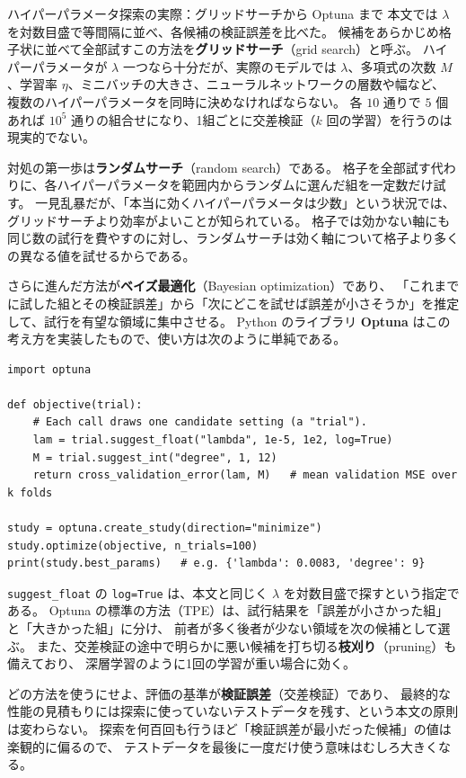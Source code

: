 \begin{mlcolumn}{ハイパーパラメータ探索の実際：グリッドサーチから Optuna まで}
本文では $\lambda$ を対数目盛で等間隔に並べ、各候補の検証誤差を比べた。
候補をあらかじめ格子状に並べて全部試すこの方法を\textbf{グリッドサーチ}（grid search）と呼ぶ。
ハイパーパラメータが $\lambda$ 一つなら十分だが、実際のモデルでは
$\lambda$、多項式の次数 $M$、学習率 $\eta$、ミニバッチの大きさ、ニューラルネットワークの層数や幅など、
複数のハイパーパラメータを同時に決めなければならない。
各 $10$ 通りで $5$ 個あれば $10^5$ 通りの組合せになり、1組ごとに交差検証（$k$ 回の学習）を行うのは現実的でない。

対処の第一歩は\textbf{ランダムサーチ}（random search）である。
格子を全部試す代わりに、各ハイパーパラメータを範囲内からランダムに選んだ組を一定数だけ試す。
一見乱暴だが、「本当に効くハイパーパラメータは少数」という状況では、グリッドサーチより効率がよいことが知られている。
格子では効かない軸にも同じ数の試行を費やすのに対し、ランダムサーチは効く軸について格子より多くの異なる値を試せるからである。

さらに進んだ方法が\textbf{ベイズ最適化}（Bayesian optimization）であり、
「これまでに試した組とその検証誤差」から「次にどこを試せば誤差が小さそうか」を推定して、試行を有望な領域に集中させる。
Python のライブラリ \textbf{Optuna} はこの考え方を実装したもので、使い方は次のように単純である。
\begin{verbatim}
import optuna

def objective(trial):
    # Each call draws one candidate setting (a "trial").
    lam = trial.suggest_float("lambda", 1e-5, 1e2, log=True)
    M = trial.suggest_int("degree", 1, 12)
    return cross_validation_error(lam, M)   # mean validation MSE over k folds

study = optuna.create_study(direction="minimize")
study.optimize(objective, n_trials=100)
print(study.best_params)   # e.g. {'lambda': 0.0083, 'degree': 9}
\end{verbatim}
\texttt{suggest\_float} の \texttt{log=True} は、本文と同じく $\lambda$ を対数目盛で探すという指定である。
Optuna の標準の方法（TPE）は、試行結果を「誤差が小さかった組」と「大きかった組」に分け、
前者が多く後者が少ない領域を次の候補として選ぶ。
また、交差検証の途中で明らかに悪い候補を打ち切る\textbf{枝刈り}（pruning）も備えており、
深層学習のように1回の学習が重い場合に効く。

どの方法を使うにせよ、評価の基準が\textbf{検証誤差}（交差検証）であり、
最終的な性能の見積もりには探索に使っていないテストデータを残す、という本文の原則は変わらない。
探索を何百回も行うほど「検証誤差が最小だった候補」の値は楽観的に偏るので、
テストデータを最後に一度だけ使う意味はむしろ大きくなる。
\end{mlcolumn}

